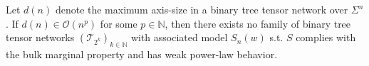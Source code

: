 \documentclass[../../main.tex]{subfiles}
\begin{document}
    \begin{theorem}
        Let $d(n)$ denote the maximum axis-size in a binary tree tensor network over $\Sigma^n$. If $d(n) \in \mathcal{O}(n^p)$ for some $p \in \mathbb{N}$, then there exists no family of binary tree tensor networks $\left(\mathcal{T}_{2^k}\right)_{k \in \mathbb{N}}$ with associated model $S_n(w)$ s.t. $S$ complies with the bulk marginal property and has weak power-law behavior.
    \end{theorem}
\end{document}
